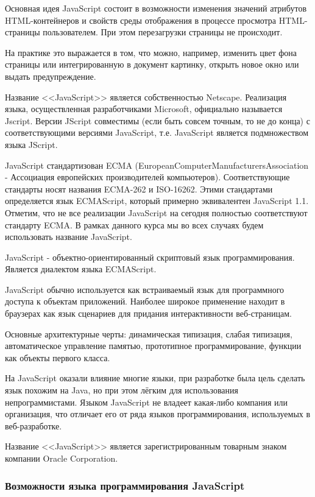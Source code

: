 Основная идея JavaScript состоит в возможности изменения значений атрибутов HTML-контейнеров и свойств среды отображения в процессе просмотра HTML-страницы пользователем. При этом перезагрузки страницы не происходит.

На практике это выражается в том, что можно, например, изменить цвет фона страницы или интегрированную в документ картинку, открыть новое окно или выдать предупреждение.

Название <<JavaScript>> является собственностью Netscape. Реализация языка, осуществленная разработчиками Microsoft, официально называется Jscript. Версии JScript совместимы (если быть совсем точным, то не до конца) с соответствующими версиями JavaScript, т.е. JavaScript является подмножеством языка JScript.

JavaScript стандартизован ECMA (European\-Computer\-Manufacturers\-Association - Ассоциация европейских производителей компьютеров). Соответствующие стандарты носят названия ECMA-262 и ISO-16262. Этими стандартами определяется язык ECMAScript, который примерно эквивалентен JavaScript 1.1. Отметим, что не все реализации JavaScript на сегодня полностью соответствуют стандарту ECMA. В рамках данного курса мы во всех случаях будем использовать название JavaScript.

JavaScript - объектно-ориентированный скриптовый язык программирования. Является диалектом языка ECMAScript.

JavaScript обычно используется как встраиваемый язык для программного доступа к объектам приложений. Наиболее широкое применение находит в браузерах как язык сценариев для придания интерактивности веб-страницам.

Основные архитектурные черты: динамическая типизация, слабая типизация, автоматическое управление памятью, прототипное программирование, функции как объекты первого класса.

На JavaScript оказали влияние многие языки, при разработке была цель сделать язык похожим на Java, но при этом лёгким для использования непрограммистами. Языком JavaScript не владеет какая-либо компания или организация, что отличает его от ряда языков программирования, используемых в веб-разработке.

Название <<JavaScript>> является зарегистрированным товарным знаком компании Oracle Corporation.

\subsubsection{Возможности языка программирования JavaScript}
\

